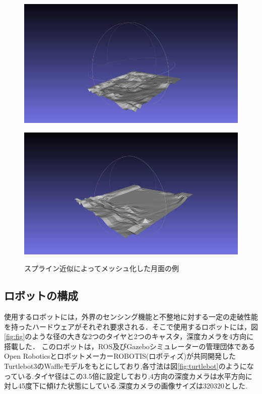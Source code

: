 \documentclass[uplatex,twocolumn, dvipdfmx]{jsarticle}  %
\begin{document}
\begin{figure}[b]
  \centering
  \begin{minipage}[b]{0.49\linewidth}
    \centering
    \includegraphics[keepaspectratio, scale=0.25]{images/spline1.png}
    \label{fig:spline1}
  \end{minipage}
  \begin{minipage}[b]{0.49\linewidth}
    \centering
    \includegraphics[keepaspectratio, scale=0.24]{images/spline2.png}
    \label{fig:spline2}
  \end{minipage}
  \caption{スプライン近似によってメッシュ化した月面の例}\label{fig:mesh_moons}
\end{figure}

\subsection{ロボットの構成}
使用するロボットには，外界のセンシング機能と不整地に対する一定の走破性能を持ったハードウェアがそれぞれ要求される．そこで使用するロボットには，図\ref{fig:fig}のような径の大きな2つのタイヤと2つのキャスタ，深度カメラを4方向に搭載した．
このロボットは，ROS及びGazeboシミュレーターの管理団体であるOpen RoboticsとロボットメーカーROBOTIS(ロボティズ)が共同開発したTurtlebot3\cite{bunken4}のWaffleモデルをもとにしており,各寸法は図\ref{fig:turtlebot}のようになっている.タイヤ径はこの3.5倍に設定しており,4方向の深度カメラは水平方向に対し45度下に傾けた状態にしている.深度カメラの画像サイズは320\times320とした.
\end{document}
